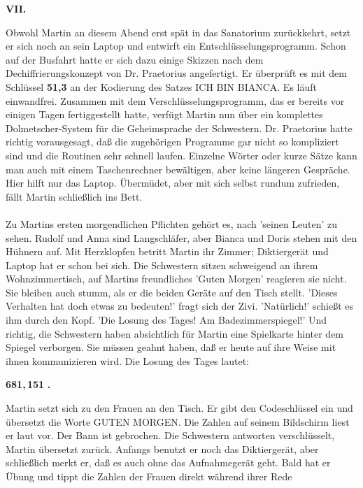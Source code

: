 \begin{center}
{\bf VII.}
\end{center}
Obwohl Martin an diesem Abend erst sp\"at in das Sanatorium
zur\"uckkehrt, setzt er sich noch an sein Laptop und entwirft ein
Entschl\"usselungsprogramm. Schon auf der Busfahrt hatte er sich dazu einige
Skizzen nach dem Dechiffrierungskonzept von Dr. Praetorius angefertigt. Er
\"uberpr\"uft es mit dem Schl\"ussel {\bf 51,3} an der Kodierung des Satzes
ICH BIN BIANCA. Es l\"auft einwandfrei. Zusammen mit dem
Verschl\"usselungsprogramm, das er bereits vor einigen Tagen fertiggestellt
hatte, verf\"ugt Martin nun \"uber ein komplettes Dolmetscher-System f\"ur
die Geheimsprache der Schwestern. Dr. Praetorius hatte richtig vorausgesagt,
da{\ss} die zugeh\"origen Programme gar nicht so kompliziert sind und die
Routinen sehr schnell laufen. Einzelne W\"orter oder kurze S\"atze kann man
auch mit einem Taschenrechner bew\"altigen, aber keine l\"angeren Gespr\"ache.
Hier hilft nur das Laptop. \"Uberm\"udet, aber mit sich selbst rundum
zufrieden, f\"allt Martin schlie{\ss}lich ins Bett. \\ \\
Zu Martins ersten morgendlichen Pflichten geh\"ort es, nach 'seinen Leuten'
zu sehen. Rudolf und Anna sind Langschl\"afer, aber Bianca und Doris stehen
mit den H\"uhnern auf. Mit Herzklopfen betritt Martin ihr Zimmer;
Diktierger\"at und Laptop hat er schon bei sich. Die Schwestern sitzen
schweigend an ihrem Wohnzimmertisch, auf Martins freundliches 'Guten Morgen'
reagieren sie nicht. Sie bleiben auch stumm, als er die beiden Ger\"ate auf
den Tisch stellt. 'Dieses Verhalten hat doch etwas zu bedeuten!' fragt sich
der Zivi. 'Nat\"urlich!' schie{\ss}t es ihm durch den Kopf. 'Die Losung des
Tages! Am Badezimmerspiegel!' Und richtig, die Schwestern haben absichtlich
f\"ur Martin eine Spielkarte hinter dem Spiegel verborgen. Sie m\"ussen
geahnt haben, da{\ss} er heute auf ihre Weise mit ihnen kommunizieren wird.
Die Losung des Tages lautet:
\begin{center}
{\bf 681,\,151\,\,.}
\end{center}
Martin setzt sich zu den Frauen an den Tisch. Er gibt den Codeschl\"ussel ein
und \"ubersetzt die Worte GUTEN MORGEN. Die Zahlen auf seinem Bildschirm liest
er laut vor. Der Bann ist gebrochen. Die Schwestern antworten verschl\"usselt,
Martin \"ubersetzt zur\"uck. Anfangs benutzt er noch das Diktierger\"at, aber
schlie{\ss}lich merkt er, da{\ss} es auch ohne das Aufnahmeger\"at geht. Bald
hat er \"Ubung und tippt die Zahlen der Frauen direkt w\"ahrend ihrer Rede
